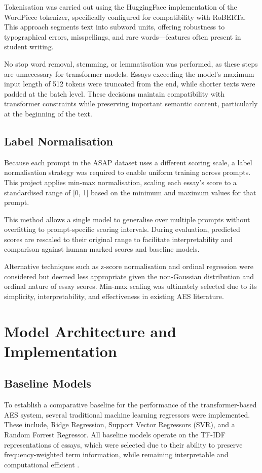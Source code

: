 \documentclass[12pt,a4paper]{report}
\begin{document}
Tokenisation was carried out using the HuggingFace implementation of the WordPiece tokenizer, specifically configured for compatibility with RoBERTa. This approach segments text into subword units, offering robustness to typographical errors, misspellings, and rare words—features often present in student writing.

No stop word removal, stemming, or lemmatisation was performed, as these steps are unnecessary for transformer models. Essays exceeding the model's maximum input length of 512 tokens were truncated from the end, while shorter texts were padded at the batch level. These decisions maintain compatibility with transformer constraints while preserving important semantic content, particularly at the beginning of the text.

\subsection{Label Normalisation}
Because each prompt in the ASAP dataset uses a different scoring scale, a label normalisation strategy was required to enable uniform training across prompts. This project applies min-max normalisation, scaling each essay’s score to a standardised range of [0, 1] based on the minimum and maximum values for that prompt.

This method allows a single model to generalise over multiple prompts without overfitting to prompt-specific scoring intervals. During evaluation, predicted scores are rescaled to their original range to facilitate interpretability and comparison against human-marked scores and baseline models.

Alternative techniques such as z-score normalisation and ordinal regression were considered but deemed less appropriate given the non-Gaussian distribution and ordinal nature of essay scores. Min-max scaling was ultimately selected due to its simplicity, interpretability, and effectiveness in existing AES literature.


\section{Model Architecture and Implementation}
\subsection{Baseline Models}
To establish a comparative baseline for the performance of the transformer-based AES system, several traditional machine learning regressors were implemented. These include, Ridge Regression, Support Vector Regressors (SVR), and a Random Forrest Regressor. All baseline models operate on the TF-IDF representations of essays, which were selected due to their ability to preserve frequency-weighted term information, while remaining interpretable and computational efficient \citep{zhang2020automated}.
\end{document}
